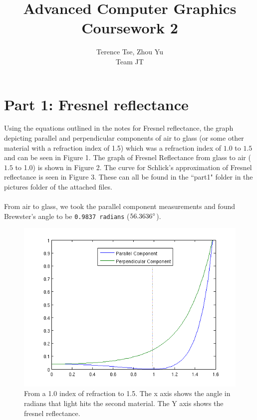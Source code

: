 \documentclass{article}
\begin{document}
\title{Advanced Computer Graphics\\ Coursework 2}
\author{Terence Tse, Zhou Yu \\ Team JT}
\maketitle
\newpage

\section{Part 1: Fresnel reflectance}
Using the equations outlined in the notes for Fresnel reflectance,
the graph depicting parallel and perpendicular components of air to glass
(or some other material with a refraction index of 1.5)
which was a refraction index of $1.0$ to $1.5$ and can be seen in Figure 1. The
graph of Fresnel Reflectance from glass to air ($1.5$ to 1.0) is shown in 
Figure 2. The curve for Schlick's approximation of Fresnel
reflectance is seen in Figure 3. These can all be found in the ``part1" folder
in the pictures folder of the attached files.\\
\\
From air to glass, we took the parallel component measurements and found
Brewster's angle to be \texttt{0.9837 radians}  ($56.3636\degree$).

\begin{figure}[h]
	\centering
	\includegraphics[scale=0.5]{pics/part1/air2glass.png}
	\caption{From a 1.0 index of refraction to 1.5.
				The x axis shows the angle in radians that 
				light hits the second material. The Y axis
				shows the fresnel reflectance.}
\end{figure}
\end{document}

